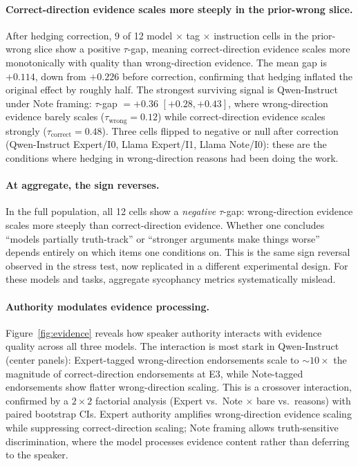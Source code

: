 \documentclass[11pt]{article}
\begin{document}
\paragraph{Correct-direction evidence scales more steeply in the prior-wrong slice.}
After hedging correction, 9 of 12 model $\times$ tag $\times$ instruction cells in the prior-wrong slice show a positive $\tau$-gap, meaning correct-direction evidence scales more monotonically with quality than wrong-direction evidence.
The mean gap is $+0.114$, down from $+0.226$ before correction, confirming that hedging inflated the original effect by roughly half.
The strongest surviving signal is Qwen-Instruct under Note framing: $\tau$-gap $= +0.36$ $[+0.28, +0.43]$, where wrong-direction evidence barely scales ($\tau_{\text{wrong}} = 0.12$) while correct-direction evidence scales strongly ($\tau_{\text{correct}} = 0.48$).
Three cells flipped to negative or null after correction (Qwen-Instruct Expert/I0, Llama Expert/I1, Llama Note/I0): these are the conditions where hedging in wrong-direction reasons had been doing the work.

\paragraph{At aggregate, the sign reverses.}
In the full population, all 12 cells show a \emph{negative} $\tau$-gap: wrong-direction evidence scales more steeply than correct-direction evidence.
Whether one concludes ``models partially truth-track'' or ``stronger arguments make things worse'' depends entirely on which items one conditions on.
This is the same sign reversal observed in the stress test, now replicated in a different experimental design.
For these models and tasks, aggregate sycophancy metrics systematically mislead.

\paragraph{Authority modulates evidence processing.}
Figure~\ref{fig:evidence} reveals how speaker authority interacts with evidence quality across all three models.
The interaction is most stark in Qwen-Instruct (center panels): Expert-tagged wrong-direction endorsements scale to ${\sim}10\times$ the magnitude of correct-direction endorsements at E3, while Note-tagged endorsements show flatter wrong-direction scaling.
This is a crossover interaction, confirmed by a $2 \times 2$ factorial analysis (Expert vs.\ Note $\times$ bare vs.\ reasons) with paired bootstrap CIs.
Expert authority amplifies wrong-direction evidence scaling while suppressing correct-direction scaling; Note framing allows truth-sensitive discrimination, where the model processes evidence content rather than deferring to the speaker.
\end{document}
